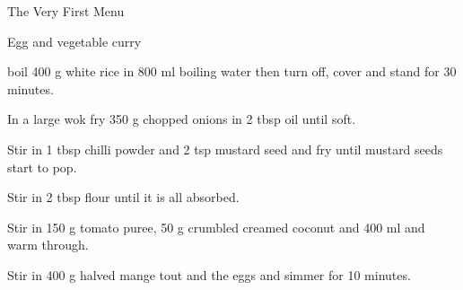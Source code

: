 \begin{menu}{The Very First Menu}
\begin{recipe}{2}{Egg and vegetable curry}
\begin{instructions}
      boil 
      400 g  white rice
      in 
      800 ml  boiling water
      then turn off, cover and stand for 30 minutes.
    \item 
        In a large wok fry
        350 g chopped onions
        in
        2 tbsp  oil
        until soft.
      \item 
        Stir in 1 tbsp  chilli powder
        and
        2 tsp  mustard seed
        and fry until mustard seeds start to pop.
      \item 
      Stir in
      2 tbsp  flour
		  until it is all absorbed.
    \item 
      Stir in
      150 g  tomato puree,
      50 g crumbled creamed coconut
      and
      400 ml  
      and warm through.
    \item 
      Stir in 
      400 g halved mange tout
      and the eggs
		  and simmer for 10 minutes.
    
    \end{instructions}
    \end{recipe}%
  
    \clearpage
    \end{menu}
	
